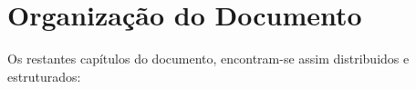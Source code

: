 % 
\bigskip 






\section{Organização do Documento}
\label{sec:intro_document_outline}

Os restantes capítulos do documento, encontram-se assim distribuidos e estruturados:

